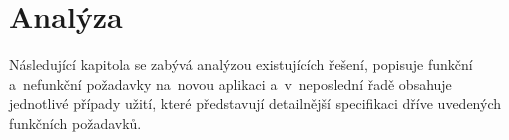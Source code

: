 \chapter{Analýza}
Následující kapitola se zabývá analýzou existujících řešení, popisuje funkční a~nefunkční požadavky na~novou aplikaci a~v~neposlední řadě obsahuje jednotlivé případy užití, které představují detailnější specifikaci dříve uvedených funkčních požadavků.




\newpage

